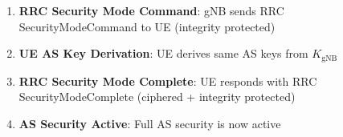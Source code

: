 \begin{enumerate}
  \begin{itemize}
  \tightlist
  \item
    \ensuremath{K_{\mathrm{RRCint}}} = KDF(\ensuremath{K_{\mathrm{gNB}}}, RRC-int-alg-ID)
  \item
    \ensuremath{K_{\mathrm{RRCenc}}} = KDF(\ensuremath{K_{\mathrm{gNB}}}, RRC-enc-alg-ID)
  \item
    \ensuremath{K_{\mathrm{UPenc}}} = KDF(\ensuremath{K_{\mathrm{gNB}}}, UP-enc-alg-ID)
  \item
    \ensuremath{K_{\mathrm{UPint}}} = KDF(\ensuremath{K_{\mathrm{gNB}}}, UP-int-alg-ID) [optional for DRBs]
  \end{itemize}
\item
  \textbf{RRC Security Mode Command}: gNB sends RRC SecurityModeCommand to UE (integrity protected)
\item
  \textbf{UE AS Key Derivation}: UE derives same AS keys from \ensuremath{K_{\mathrm{gNB}}}
\item
  \textbf{RRC Security Mode Complete}: UE responds with RRC SecurityModeComplete (ciphered + integrity protected)
\item
  \textbf{AS Security Active}: Full AS security is now active
\end{enumerate}









